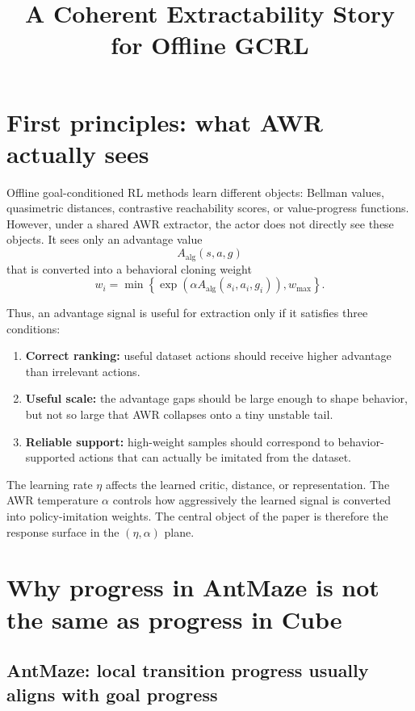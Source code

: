 \documentclass[11pt]{article}
\title{A Coherent Extractability Story for Offline GCRL}
\author{}
\date{}
\begin{document}
\maketitle

\section{First principles: what AWR actually sees}

Offline goal-conditioned RL methods learn different objects: Bellman values, quasimetric distances,
contrastive reachability scores, or value-progress functions. However, under a shared AWR extractor,
the actor does not directly see these objects. It sees only an advantage value
\[ A_{\mathrm{alg}}(s,a,g) \]
that is converted into a behavioral cloning weight
\[ w_i = \min\left\{ \exp\left(\alpha A_{\mathrm{alg}}(s_i,a_i,g_i)\right), w_{\max} \right\}. \]

Thus, an advantage signal is useful for extraction only if it satisfies three conditions:
\begin{enumerate}[leftmargin=2em]
    \item \textbf{Correct ranking:} useful dataset actions should receive higher advantage than irrelevant actions.
    \item \textbf{Useful scale:} the advantage gaps should be large enough to shape behavior, but not so large that AWR collapses onto a tiny unstable tail.
    \item \textbf{Reliable support:} high-weight samples should correspond to behavior-supported actions that can actually be imitated from the dataset.
\end{enumerate}

The learning rate $\eta$ affects the learned critic, distance, or representation.
The AWR temperature $\alpha$ controls how aggressively the learned signal is converted into policy-imitation weights.
The central object of the paper is therefore the response surface in the $(\eta,\alpha)$ plane.

\section{Why progress in AntMaze is not the same as progress in Cube}

\subsection{AntMaze: local transition progress usually aligns with goal progress}
\end{document}

